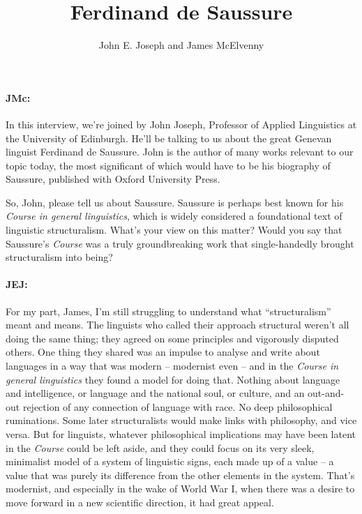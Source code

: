 \documentclass[output=paper]{langscibook}
\author{John E. Joseph\orcid{}\affiliation{University of Edinburgh} and James McElvenny\affiliation{University of Siegen}}
\title{Ferdinand de Saussure}
\begin{document}
\maketitle 

\paragraph*{JMc:}  In this interview, we’re joined by John Joseph, Professor of Applied Linguistics at the University of Edinburgh. He’ll be talking to us about the great Genevan linguist Ferdinand de Saussure. John is the author of many works relevant to our topic today, the most significant of which would have to be his \citeyear{joseph2012a} biography of Saussure, published with Oxford University Press.

So, John, please tell us about Saussure. Saussure is perhaps best known for his \textit{Course in general linguistics}, which is widely considered a foundational text of linguistic structuralism. What’s your view on this matter? Would you say that Saussure’s \textit{Course} was a truly groundbreaking work that single-handedly brought structuralism into being?


\paragraph*{JEJ:}  For my part, James, I’m still struggling to understand what “structuralism” meant and means. The linguists who called their approach structural weren’t all doing the same thing; they agreed on some principles and vigorously disputed others. One thing they shared was an impulse to analyse and write about languages in a way that was modern – modernist even – and in the \textit{Course in general linguistics} they found a model for doing that. Nothing about language and intelligence, or language and the national soul, or culture, and an out-and-out rejection of any connection of language with race. No deep philosophical ruminations. Some later structuralists would make links with philosophy, and vice versa. But for linguists, whatever philosophical implications may have been latent in the \textit{Course} could be left aside, and they could focus on its very sleek, mini\-malist model of a system of linguistic signs, each made up of a value – a value that was purely its difference from the other elements in the system. That’s modernist, and especially in the wake of World War I, when there was a desire to move forward in a new scientific direction, it had great appeal.
\end{document}
